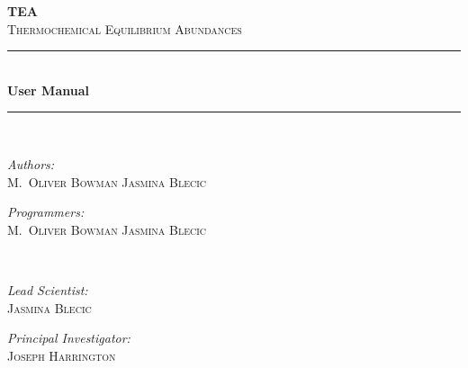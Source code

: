 

\usepackage{epsfig}
\textwidth=6.5in
\textheight=9.5in
\topmargin=-0.75in
\oddsidemargin=0.0in
\evensidemargin=0.0in

\pagestyle{myheadings}

  


\begin{titlepage}
\begin{center}

\textsc{\huge \bfseries TEA}\\[0.5cm]
\textsc{\LARGE Thermochemical Equilibrium Abundances}\\[0.5cm]
\rule{250pt}{0.4pt} \\[0.4cm]
{ \huge \bfseries User Manual\\[0.4cm] }

\rule{250pt}{0.4pt} \\[1cm]

\begin{minipage}{0.4\textwidth}
\begin{flushleft} \large
\emph{Authors:}\\
 \textsc{M.~Oliver Bowman Jasmina Blecic}
\end{flushleft}
\end{minipage}
\begin{minipage}{0.4\textwidth}
\begin{flushright} \large
\emph{Programmers: } \\
\textsc{M.~Oliver Bowman Jasmina Blecic }
\end{flushright}
\end{minipage}\\[1.5cm]


\begin{minipage}{0.4\textwidth}
\begin{flushleft} \large
\emph{Lead Scientist:}\\
 \textsc{Jasmina Blecic}
\end{flushleft}
\end{minipage}
\begin{minipage}{0.4\textwidth}
\begin{flushright} \large
\emph{Principal Investigator:} \\
\textsc{Joseph Harrington}
\end{flushright}
\end{minipage}\\[1.5cm]


\end{center}
\end{titlepage}
